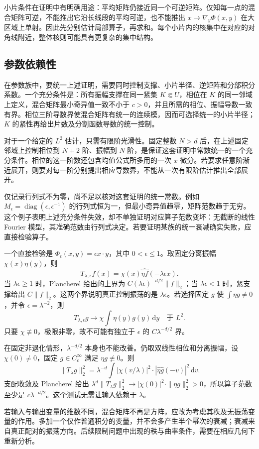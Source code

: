 小片条件在证明中有明确用途：平均矩阵仍接近同一个可逆矩阵。仅知每一点的混合矩阵可逆，不能推出它沿长线段的平均可逆，也不能推出 \(x\mapsto\nabla_y\Phi(x,y)\) 在大区域上单射。因此先分别估计局部算子，再求和。每个小片内的核集中在对应的对角线附近，整体核则可能具有更复杂的集中结构。

\subsection{参数依赖性}
\label{b2:subsec:210404}

在参数族中，要统一上述证明，需要同时控制支撑、小片半径、逆矩阵和分部积分系数。一个充分条件是：所有振幅支撑在同一紧集 \(K\Subset U\)，相位在 \(K\) 的同一邻域上定义，混合矩阵最小奇异值一致不小于 \(c>0\)，并且所需的相位、振幅导数一致有界。相位三阶导数界使混合矩阵有统一的连续模，因而可选择统一的小片半径；\(K\) 的紧性再给出片数及分割函数导数的统一控制。

\ProseParagraphBreak
对于一个给定的 \(L^2\) 估计，只需有限阶光滑性。固定整数 \(N>d\) 后，在上述固定邻域上控制相位到 \(N+2\) 阶、振幅到 \(N\) 阶，是保证这套证明中常数统一的一个充分条件。相位的这一阶数还包含均值公式所多用的一次 \(x\) 微分。若要求任意阶渐近展开，则要对每一阶分别提出相应导数界，不能从一次有限阶估计推出全部展开。

\ProseParagraphBreak
仅记录行列式不为零，尚不足以核对这套证明的统一常数。例如
\(M_\epsilon=\operatorname{diag}(\epsilon,\epsilon^{-1})\)
的行列式恒为一，但最小奇异值趋零，矩阵范数趋于无穷。这个例子表明上述充分条件失效，却不单独证明对应算子范数变坏：无截断的线性 Fourier 模型，其准确范数由行列式决定。若要证明某族的统一衰减确实失败，应直接检验算子。

\ProseParagraphBreak
一个直接检验是 \(\Phi_\epsilon(x,y)=\epsilon x\cdot y\)，其中 \(0<\epsilon\le1\)。取固定分离振幅 \(\chi(x)\eta(y)\)，则
\[
 T_{\lambda,\epsilon}f(x)
 =\chi(x)\widehat{\eta f}(-\lambda\epsilon x).
\]
当 \(\lambda\epsilon\ge1\) 时，Plancherel 给出的上界为
\(C(\lambda\epsilon)^{-d/2}\|f\|_2\)；当 \(\lambda\epsilon<1\) 时，紧支撑给出 \(C\|f\|_2\)。这两个界说明真正控制振荡的是 \(\lambda\epsilon\)。若选择固定 \(g\) 使 \(\int\eta g\ne0\)，并令 \(\epsilon=\lambda^{-2}\)，则
\[
 T_{\lambda,\epsilon}g\longrightarrow
 \chi\int\eta(y)g(y)\,\mathrm dy
 \quad\text{于 }L^2.
\]
只要 \(\chi\not\equiv0\)，极限非零，故不可能有独立于 \(\epsilon\) 的 \(C\lambda^{-d/2}\) 界。

\ProseParagraphBreak
在固定非退化情形，\(\lambda^{-d/2}\) 本身也不能改善。仍取双线性相位和分离振幅，设 \(\chi(0)\ne0\)，固定 \(g\in C_c^\infty\) 满足 \(\eta g\not\equiv0\)。则
\[
 \|T_\lambda g\|_2^2
 =\lambda^{-d}\int |\chi(v/\lambda)|^2\cdot
                     |\widehat{\eta g}(-v)|^2\,\mathrm dv.
\]
支配收敛及 Plancherel 给出
\(\lambda^d\|T_\lambda g\|_2^2
 \to |\chi(0)|^2\cdot\|\eta g\|_2^2>0\)，所以算子范数至少是 \(c\lambda^{-d/2}\)。这个测试无需让输入依赖于 \(\lambda\)。

\ProseParagraphBreak
若输入与输出变量的维数不同，混合矩阵不再是方阵，应改为考虑其秩及无振荡变量的作用。多加一个仅作普通积分的变量，并不会多产生半个幂次的衰减；衰减来自真正配对的振荡方向。后续限制问题中出现的秩与曲率条件，需要在相应几何下重新分析。
